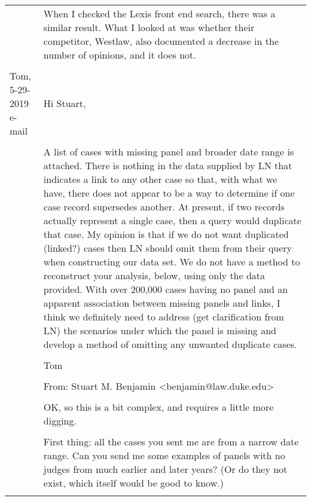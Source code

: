 \documentclass[10pt, letterpaper]{article}
\begin{document}
\begin{spacing}{1.0}
\begin{longtable}{p{1.5in}p{5in}}
    &When I checked the Lexis front end search, there was a similar result. What I looked at was whether their competitor, Westlaw, also documented a decrease in the number of opinions, and it does not. \\\\
    
    
    
    Tom, 5-29-2019 e-mail & Hi Stuart,\\\\
    
    &A list of cases with missing panel and broader date range is attached.  There is nothing in the data supplied by LN that indicates a link to any other case so that, with what we have, there does not appear to be a way to determine if one case record supersedes another.  At present, if two records actually represent a single case, then a query would duplicate that case.  My opinion is that if we do not want duplicated (linked?) cases then LN should omit them from their query when constructing our data set.  We do not have a method to reconstruct your analysis, below, using only the data provided.  With over 200,000 cases having no panel and an apparent association between missing panels and links, I think we definitely need to address (get clarification from LN) the scenarios under which the panel is missing and develop a method of omitting any unwanted duplicate cases.\\\\
    
    &Tom  \\\\
    
    &From: Stuart M. Benjamin <benjamin@law.duke.edu> \\\\
    
    &OK, so this is a bit complex, and requires a little more digging.\\\\
    
    &First thing: all the cases you sent me are from a narrow date range. Can you send me some examples of panels with no judges from much earlier and later years? (Or do they not exist, which itself would be good to know.)\\\\
    

\end{longtable}
\end{spacing}
\end{document}
